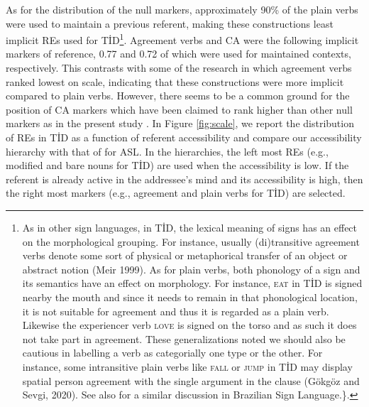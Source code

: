 \documentclass[review]{elsarticle} %
\begin{document}
As for the distribution of the null markers, approximately 90\% of the
plain verbs were used to maintain a previous referent, making these
constructions least implicit REs used for TİD\footnote{As in other sign
  languages, in TİD, the lexical meaning of signs has an effect on the
  morphological grouping. For instance, usually (di)transitive agreement
  verbs denote some sort of physical or metaphorical transfer of an
  object or abstract notion (Meir 1999). As for plain verbs, both
  phonology of a sign and its semantics have an effect on morphology.
  For instance, \textsc{eat} in TİD is signed nearby the mouth and since
  it needs to remain in that phonological location, it is not suitable
  for agreement and thus it is regarded as a plain verb. Likewise the
  experiencer verb \textsc{love} is signed on the torso and as such it
  does not take part in agreement. These generalizations noted we should
  also be cautious in labelling a verb as categorially one type or the
  other. For instance, some intransitive plain verbs like \textsc{fall}
  or \textsc{jump} in TİD may display spatial person agreement with the
  single argument in the clause (Gökgöz and Sevgi, 2020). See also for a
  similar discussion in Brazilian Sign Language.\}.}. Agreement verbs
and CA were the following implicit markers of reference, 0.77 and 0.72
of which were used for maintained contexts, respectively. This contrasts
with some of the research \citep{czubek2017} in which agreement verbs
ranked lowest on scale, indicating that these constructions were more
implicit compared to plain verbs. However, there seems to be a common
ground for the position of CA markers which have been claimed to rank
higher than other null markers as in the present study
\citep{frederiksen2016, czubek2017, barbera2009}. In Figure
\ref{fig:scale}, we report the distribution of REs in TİD as a function
of referent accessibility and compare our accessibility hierarchy with
that of \citep{frederiksen2016} for ASL. In the hierarchies, the left
most REs (e.g., modified and bare nouns for TİD) are used when the
accessibility is low. If the referent is already active in the
addressee's mind and its accessibility is high, then the right most
markers (e.g., agreement and plain verbs for TİD) are selected.
\end{document}
